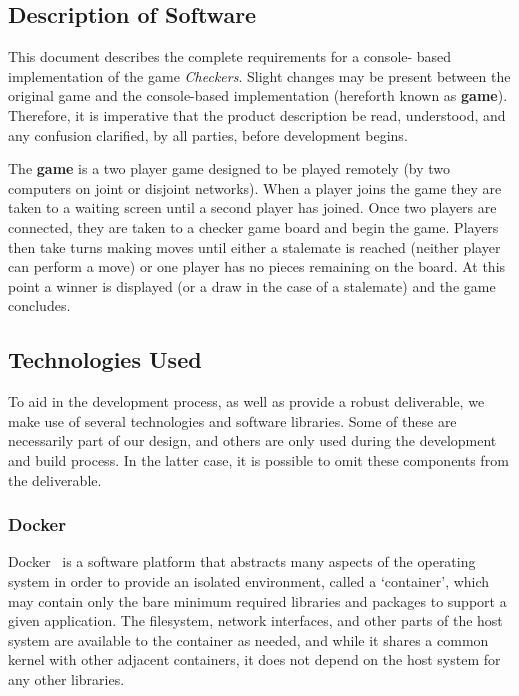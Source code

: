 \documentclass[letterpaper]{article}
\begin{document}
\subsection{Description of Software}
\label{sec:overview_description}

This document describes the complete requirements for a console-
based implementation of the game \emph{Checkers}. Slight changes
may be present between the original game and the console-based
implementation (hereforth known as \textbf{game}). Therefore, it
is imperative that the product description be read, understood,
and any confusion clarified, by all parties, before development
begins.

The \textbf{game} is a two player game designed to be played
remotely (by two computers on joint or disjoint networks). When
a player joins the game they are taken to a waiting screen until
a second player has joined. Once two players are connected, they
are taken to a checker game board and begin the game. Players
then take turns making moves until either a stalemate is reached
(neither player can perform a move) or one player has no pieces
remaining on the board. At this point a winner is displayed (or
a draw in the case of a stalemate) and the game concludes.

\subsection{Technologies Used}
\label{sec:overview_technologies}

To aid in the development process, as well as provide a robust
deliverable, we make use of several technologies and software
libraries. Some of these are necessarily part of our design, and
others are only used during the development and build process.
In the latter case, it is possible to omit these components from
the deliverable.

\subsubsection{Docker}
\label{sec:overview_technologies_docker}

Docker~\cite{docker} is a software platform that abstracts many
aspects of the operating system in order to provide an isolated
environment, called a `container', which may contain only the
bare minimum required libraries and packages to support a given
application. The filesystem, network interfaces, and other parts
of the host system are available to the container as needed, and
while it shares a common kernel with other adjacent containers,
it does not depend on the host system for any other libraries.
\end{document}

